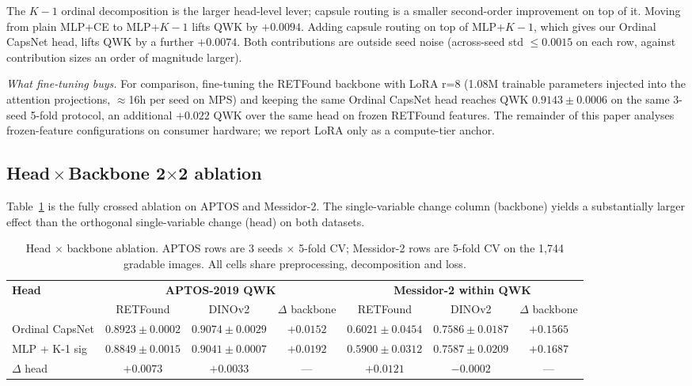 \documentclass[journal]{IEEEtran}
\begin{document}
The $K{-}1$ ordinal decomposition is the larger head-level lever; capsule routing is a smaller second-order improvement on top of it. Moving from plain MLP+CE to MLP+$K{-}1$ lifts QWK by $+0.0094$. Adding capsule routing on top of MLP+$K{-}1$, which gives our Ordinal CapsNet head, lifts QWK by a further $+0.0074$. Both contributions are outside seed noise (across-seed std $\leq 0.0015$ on each row, against contribution sizes an order of magnitude larger).

\textit{What fine-tuning buys.} For comparison, fine-tuning the RETFound backbone with LoRA r=8 (1.08M trainable parameters injected into the attention projections, $\approx$16h per seed on MPS) and keeping the same Ordinal CapsNet head reaches QWK $0.9143 \pm 0.0006$ on the same 3-seed 5-fold protocol, an additional $+0.022$ QWK over the same head on frozen RETFound features. The remainder of this paper analyses frozen-feature configurations on consumer hardware; we report LoRA only as a compute-tier anchor.

\subsection{Head\,$\times$\,Backbone 2$\times$2 ablation}
\label{sec:head-backbone}

Table~\ref{tab:head_backbone} is the fully crossed ablation on APTOS and Messidor-2. The single-variable change column (backbone) yields a substantially larger effect than the orthogonal single-variable change (head) on both datasets.

\begin{table}[!t]
    \caption{Head $\times$ backbone ablation. APTOS rows are 3 seeds $\times$ 5-fold CV; Messidor-2 rows are 5-fold CV on the 1{,}744 gradable images. All cells share preprocessing, decomposition and loss.}
    \label{tab:head_backbone}
    \centering
    \footnotesize
    \begin{tabular}{@{}lcccccc@{}}
        \toprule
        \textbf{Head}   & \multicolumn{3}{c}{\textbf{APTOS-2019 QWK}} & \multicolumn{3}{c}{\textbf{Messidor-2 within QWK}}                                                                                     \\
        \cmidrule(r){2-4}\cmidrule(l){5-7}
                        & RETFound                                    & DINOv2                                             & $\Delta$ backbone & RETFound            & DINOv2              & $\Delta$ backbone \\
        \midrule
        Ordinal CapsNet & $0.8923 \pm 0.0002$ & $0.9074 \pm 0.0029$ & $+0.0152$         & $0.6021 \pm 0.0454$ & $0.7586 \pm 0.0187$ & $+0.1565$         \\
        MLP + K-1 sig   & $0.8849 \pm 0.0015$ & $0.9041 \pm 0.0007$ & $+0.0192$         & $0.5900 \pm 0.0312$ & $0.7587 \pm 0.0209$ & $+0.1687$         \\
        $\Delta$ head   & $+0.0073$           & $+0.0033$           & ---               & $+0.0121$           & $-0.0002$           & ---               \\
        \bottomrule
    \end{tabular}
\end{table}
\end{document}
